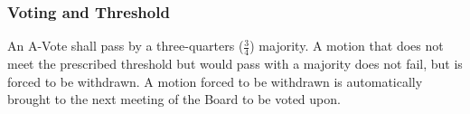 \subsubsection{Voting and Threshold}
An A-Vote shall pass by a three-quarters ($\frac{3}{4}$) majority. A motion that does not meet the prescribed threshold but would pass with a majority does not fail, but is forced to be withdrawn. A motion forced to be withdrawn is automatically brought to the next meeting of the Board to be voted upon.